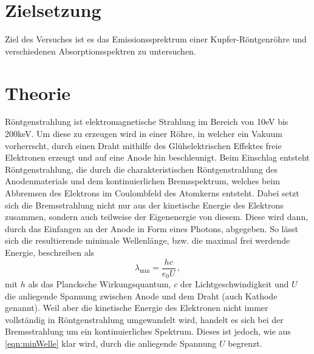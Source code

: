 \section{Zielsetzung}
Ziel des Versuches ist es das Emissionssprektrum einer Kupfer-Röntgenröhre und verschiedenen Absorptionsspektren zu untersuchen.

\section{Theorie}
Röntgenstrahlung ist elektromagnetische Strahlung im Bereich von 10eV bis 200keV. Um diese zu erzeugen wird in einer Röhre, in welcher ein Vakuum vorherrscht, durch einen Draht mithilfe des Glühelektrischen Effektes freie Elektronen erzeugt und 
auf eine Anode hin beschleunigt. Beim Einschlag entsteht Röntgenstrahlung, die durch die charakteristischen Röntgenstrahlung des Anodenmaterials und dem kontinuierlichen Bremsspektrum, 
welches beim Abbremsen des Elektrons im Coulombfeld des Atomkerns entsteht. 
Dabei setzt sich die Bremsstrahlung nicht nur aus der kinetische Energie des Elektrons zusammen, sondern auch teilweise der Eigenenergie von diesem. Diese wird dann, durch das Einfangen an der Anode in Form 
eines Photons, abgegeben. So lässt sich die resultierende minimale Wellenlänge, bzw. die maximal frei werdende Energie, beschreiben als
\begin{equation}
    \lambda_\text{min} = \frac{h c}{e_0 U} \, ,
    \label{eqn:minWelle}
\end{equation}
\noindent
mit $h$ als das Plancksche Wirkungsquantum, $c$ der Lichtgeschwindigkeit und $U$ die anliegende Spannung zwischen Anode und dem Draht (auch Kathode genannt). Weil aber die 
kinetische Energie des Elektronen nicht immer vollständig in Röntgenstrahlung umgewandelt wird, handelt es sich bei der Bremsstrahlung um ein kontinuierliches Spektrum. Dieses ist jedoch, 
wie aus \autoref{eqn:minWelle} klar wird, durch die anliegende Spannung $U$ begrenzt.

